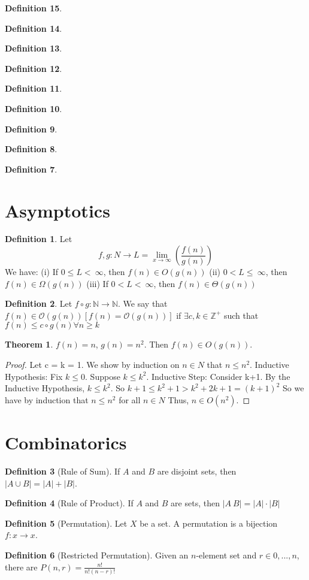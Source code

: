 \documentclass{article}
\theoremstyle{definition}
\newtheorem{define}{Definition}[section]
\newtheorem{thm}{Theorem}[section]
\begin{document}
\begin{define}
\begin{define}
\begin{define}
\begin{define}
\begin{define}
\begin{define}
\begin{define}
\begin{define}
\begin{define}
\section{Asymptotics}

\begin{define}
Let $$f,g: N \rightarrow L=\lim _{x\to \infty }\left(\frac{f\left(n\right)}{g\left(n\right)}\right)$$
We have: (i) If $0 \leq L< \:\infty$, then $f(n)\in O(g(n))$ (ii) $0 < L \leq \:\infty$, then $f(n)\in\Omega(g(n))$ (iii) If $0<L< \:\infty$, then $f(n)\in\Theta(g(n))$
\end{define}

\begin{define}
Let $f \circ g: \mathbb{N} \rightarrow \mathbb{N}$. We say that $ f(n) \in \mathcal{O}(g(n)) [f(n) = \mathcal{O}(g(n))]$ if $\exists c,k\in \mathbb{Z}^{+}$ such that $f(n) \leq c\circ g(n) \forall n \geq k$
\end{define}

\begin{thm}
$f(n)=n$, $g(n) =n^2$. Then $f(n)\in O(g(n))$.
\end{thm}
\begin{proof}
Let c = k = 1. We show by induction on $n \in N$ that $n \leq n^2$. Inductive Hypothesis: Fix $k \leq 0$. Suppose $k \leq k^2$.
Inductive Step: Consider k+1. By the Inductive Hypothesis, $k \leq k^2$. So $k+1 \leq k^2+1 > k^2 +2k+1 = (k+1)^2$ So we have by induction that $n \leq n^2$ for all $n \in N$ Thus, $n \in O(n^2)$.
\end{proof}


\section{Combinatorics}

\begin{define}[Rule of Sum]
If $A$ and $B$ are disjoint sets, then $|A \cup B| = |A| +|B|$.
\end{define}

\begin{define}[Rule of Product]
If $A$ and $B$ are sets, then $|A\ B|=|A| \cdot |B|$
\end{define}

\begin{define}[Permutation]
Let $X$ be a set. A permutation is a bijection $f: x \rightarrow x$.
\end{define}

\begin{define}[Restricted Permutation]
Given an $n$-element set and $r \in {0,...,n}$, there are $P(n,r)= \frac{n!}{n!(n-r)!}$
\end{define}


\end{define}
\end{define}
\end{define}
\end{define}
\end{define}
\end{define}
\end{define}
\end{define}
\end{define}
\end{document}
